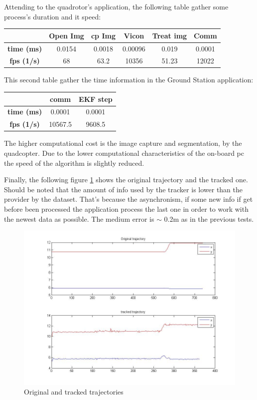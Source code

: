 	Attending to the quadrotor's application, the following table gather some process's duration and it speed:
	\newline
	\newline
	{
	\centering
		\begin{tabular}{|c|c|c|c|c|c|}
		\hline  					&  Open Img	&  cp Img 	& Vicon 	& Treat img & Comm  		\\ 
		\hline  \textbf{time (ms)}	& 	0.0154	& 0.0018	&	0.00096	&  	 0.019	&	0.0001		\\ 
		\hline  \textbf{fps (1/s)}	&  	68		&  63.2		&  10356	&  	51.23	&	12022		\\ 
		\hline 
		\end{tabular} 
	}
	\newline
	
	This second table gather the time information in the Ground Station application:
	\newline
	
	{
	\centering
		\begin{tabular}{|c|c|c|}
		\hline  					&  comm		&  EKF step	\\
		\hline  \textbf{time (ms)}	& 	0.0001	& 	0.0001	\\
		\hline  \textbf{fps (1/s)}	&  	10567.5	&  	9608.5	\\
		\hline 
		\end{tabular} 
	}
	\newline
	
	The higher computational cost is the image capture and segmentation, by the quadcopter. Due to the lower computational characteristics of the on-board pc the speed of the algorithm is slightly reduced.
	
	Finally, the following figure \ref{fig:arch_trajs} shows the original trajectory and the tracked one. Should be noted that the amount of info used by the tracker is lower than the provider by the dataset. That's because the asynchronism, if some new info if get before been processed the application process the last one in order to work with the newest data as possible. The medium error is $\sim$ 0.2m as in the previous tests.
	
	\begin{figure}[ph]
		\centering
		\includegraphics[width=0.7\linewidth]{../Images/c4/arch_trajs}
		\caption{Original and tracked trajectories}
		\label{fig:arch_trajs}
	\end{figure}

